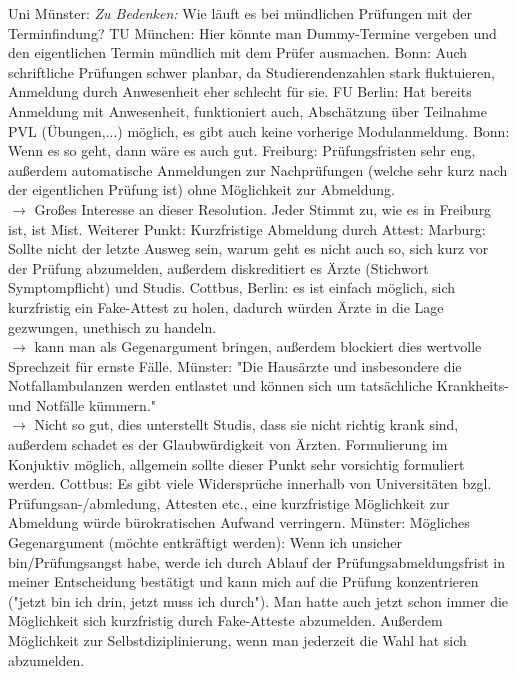\begin{outline}
        \1 Uni Münster: \textit{Zu Bedenken:} Wie läuft es bei mündlichen Prüfungen mit der Terminfindung?
          \2 TU München: Hier könnte man Dummy-Termine vergeben und den eigentlichen Termin mündlich mit dem Prüfer ausmachen.
        \1 Bonn: Auch schriftliche Prüfungen schwer planbar, da Studierendenzahlen stark fluktuieren, Anmeldung durch Anwesenheit eher schlecht für sie.
          \2 FU Berlin: Hat bereits Anmeldung mit Anwesenheit, funktioniert auch, Abschätzung über Teilnahme PVL (Übungen,...) möglich, es gibt auch keine vorherige Modulanmeldung.
          \2 Bonn: Wenn es so geht, dann wäre es auch gut.
        \1 Freiburg: Prüfungsfristen sehr eng, außerdem automatische Anmeldungen zur Nachprüfungen (welche sehr kurz nach der eigentlichen Prüfung ist) ohne Möglichkeit zur Abmeldung. \\
          $\rightarrow$ Großes Interesse an dieser Resolution.
          \2 Jeder Stimmt zu, wie es in Freiburg ist, ist Mist.
        \1 Weiterer Punkt: Kurzfristige Abmeldung durch Attest:
          \2 Marburg: Sollte nicht der letzte Ausweg sein, warum geht es nicht auch so, sich kurz vor der Prüfung abzumelden, außerdem diskreditiert es Ärzte (Stichwort Symptompflicht) und Studis.
          \2 Cottbus, Berlin: es ist einfach möglich, sich kurzfristig ein Fake-Attest zu holen, dadurch würden Ärzte in die Lage gezwungen, unethisch zu handeln. \\
            $\rightarrow$ kann man als Gegenargument bringen, außerdem blockiert dies wertvolle Sprechzeit für ernste Fälle.
          \2 Münster: "Die Hausärzte und insbesondere die Notfallambulanzen werden entlastet und können sich um tatsächliche Krankheits- und Notfälle kümmern." \\
            $\rightarrow$ Nicht so gut, dies unterstellt Studis, dass sie nicht richtig krank sind, außerdem schadet es der Glaubwürdigkeit von Ärzten.
            \3 Formulierung im Konjuktiv möglich, allgemein sollte dieser Punkt sehr vorsichtig formuliert werden.
        \1 Cottbus: Es gibt viele Widersprüche innerhalb von Universitäten bzgl. Prüfungsan-/abmledung, Attesten etc., eine kurzfristige Möglichkeit zur Abmeldung würde bürokratischen Aufwand verringern.
        \1 Münster: Mögliches Gegenargument (möchte entkräftigt werden): Wenn ich unsicher bin/Prüfungsangst habe, werde ich durch Ablauf der Prüfungsabmeldungsfrist in meiner Entscheidung bestätigt und kann mich auf die Prüfung konzentrieren ("jetzt bin ich drin, jetzt muss ich durch").
        \2 Man hatte auch jetzt schon immer die Möglichkeit sich kurzfristig durch Fake-Atteste abzumelden.
        \2 Außerdem Möglichkeit zur Selbstdiziplinierung, wenn man jederzeit die Wahl hat sich abzumelden.
      \end{outline}

